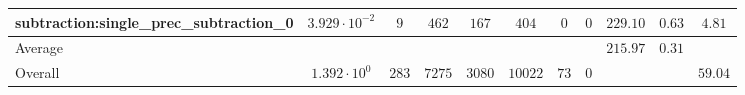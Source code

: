 \begin{tabular}{|l|c|c|c|c|c|c|c|c|c|c|}
subtraction:single\_prec\_subtraction\_0         & $ 3.929 \cdot 10^{-2} $ & $ 9      $ & $ 462  $ & $ 167  $ & $ 404   $ & $ 0  $ & $ 0 $ & $ 229.10      $ & $ 0.63    $ & $ 4.81    $ \\
\hline
Average                                          & $                     $ & $        $ & $      $ & $      $ & $       $ & $    $ & $   $ & $ 215.97      $ & $ 0.31    $ & $         $ \\
\hline
Overall                                          & $ 1.392 \cdot 10^{0}  $ & $ 283    $ & $ 7275 $ & $ 3080 $ & $ 10022 $ & $ 73 $ & $ 0 $ & $             $ & $         $ & $ 59.04   $ \\
\hline
\end{tabular}
